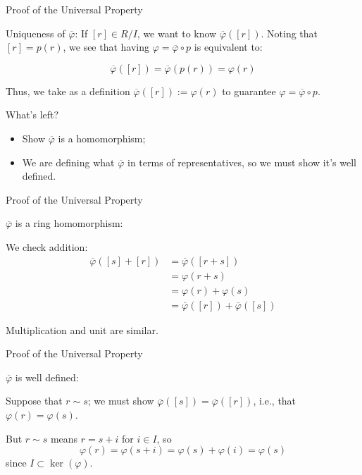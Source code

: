 \documentclass{beamer}
\begin{document}
\begin{frame}{Proof of the Universal Property}

\begin{block}{Uniqueness of $\overline{\varphi}$:}
If $[r]\in R/I$, we want to know $\overline{\varphi}([r])$.  Noting that $[r]=p(r)$, we see that having $\varphi=\overline{\varphi}\circ p$ is equivalent to: 

$$\overline{\varphi}([r])=\overline{\varphi}(p(r))=\varphi(r)$$
\end{block}

Thus, we take as a definition $\overline{\varphi}([r]):=\varphi(r)$ to guarantee $\varphi=\overline{\varphi}\circ p$. 

\begin{block}{What's left?} 
\begin{itemize}
\item Show $\overline{\varphi}$ is a homomorphism; 
\item We are defining what $\overline{\varphi}$ in terms of representatives, so we must show it's well defined.
\end{itemize}
\end{block}
\end{frame}

\begin{frame}{Proof of the Universal Property}

\begin{block}{$\overline{\varphi}$ is a ring homomorphism:}

 We check addition:
\begin{align*}
\overline{\varphi}([s]+[r]) & =\overline{\varphi}([r+s]) \\
&=\varphi(r+s) \\
& =\varphi(r)+\varphi(s) \\
&=\overline{\varphi}([r])+\overline{\varphi}([s])
\end{align*}

Multiplication and unit are similar.
\end{block}
\end{frame}

\begin{frame}{Proof of the Universal Property}
\begin{block}{ $\overline{\varphi}$ is well defined:}

  Suppose that $r\sim s$; we must show $\overline{\varphi}([s])=\overline{\varphi}([r])$, i.e., that $\varphi(r)=\varphi(s)$.


But $r\sim s$ means $r=s+i$ for $i\in I$, so 
$$\varphi(r)=\varphi(s+i)=\varphi(s)+\varphi(i)=\varphi(s)$$
since $I\subset \ker(\varphi)$.

\end{block}
\end{frame}
\end{document}
